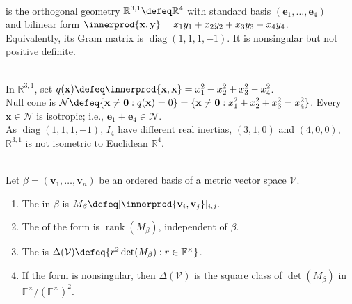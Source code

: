 \begin{definition} \label{def:minkowski-metric-vector-space} \\
 is the orthogonal geometry $\mathbb{R}^{3,1}\defeq\mathbb{R}^4$ with standard basis $(\mathbf{e}_1,\ldots,\mathbf{e}_4)$\\
and bilinear form $\innerprod{\mathbf{x},\mathbf{y}} =x_1y_1+x_2y_2+x_3y_3-x_4y_4$.\\
Equivalently, its Gram matrix is $\operatorname{diag}(1,1,1,-1)$. It is nonsingular but not positive definite.
\end{definition}

\begin{example} \label{ex:minkowski-null-cone-and-inertia} \\
In $\mathbb{R}^{3,1}$, set $q(\mathbf{x})\defeq\innerprod{\mathbf{x},\mathbf{x}} =x_1^2+x_2^2+x_3^2-x_4^2$.\\
Null cone is $\mathcal{N}\defeq\{\mathbf{x}\neq\mathbf{0}:q(\mathbf{x})=0\} =\{\mathbf{x}\neq\mathbf{0}:x_1^2+x_2^2+x_3^2=x_4^2\}$. Every $\mathbf{x}\in\mathcal{N}$ is isotropic; i.e., $\mathbf{e}_1+\mathbf{e}_4\in\mathcal{N}$.\\
As $\operatorname{diag}(1,1,1,-1)$, $I_4$ have different real inertias, $(3,1,0)$ and $(4,0,0)$, $\mathbb{R}^{3,1}$ is not isometric to Euclidean $\mathbb{R}^4$.
\end{example}

\begin{definition} \label{def:matrix-rank-and-discriminant-of-form} \\
Let $\beta=(\mathbf{v}_1,\ldots,\mathbf{v}_n)$ be an ordered basis of a metric vector space $\mathcal{V}$.
\begin{enumerate}[label=(\roman*)]
\setlength{\itemsep}{0pt}
\item The  in $\beta$ is $M_{\beta}\defeq[\innerprod{\mathbf{v}_i,\mathbf{v}_j}]_{i,j}$.
\item The  of the form is $\operatorname{rank}(M_{\beta})$, independent of $\beta$.
\item The  is $\Delta(\mathcal{V})\defeq\{r^2\det(M_{\beta}):r\in\mathbb{F}^{\times}\}$.
\item If the form is nonsingular, then $\Delta(\mathcal{V})$ is the square class of $\det(M_\beta)$ in $\mathbb{F}^{\times}/(\mathbb{F}^{\times})^2$.
\end{enumerate}
\end{definition}

